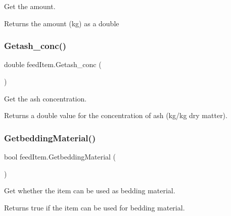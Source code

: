 Get the amount. 

\begin{DoxyReturn}{Returns}
the amount (kg) as a double 
\end{DoxyReturn}
\mbox{\label{classfeed_item_a2250428bfac6980e46db357f192d979e}} 
\subsubsection{\texorpdfstring{Getash\_conc()}{Getash\_conc()}}
{\footnotesize\ttfamily double feed\+Item.\+Getash\+\_\+conc (\begin{DoxyParamCaption}{ }\end{DoxyParamCaption})\hspace{0.3cm}{\ttfamily [inline]}}



Get the ash concentration. 

\begin{DoxyReturn}{Returns}
a double value for the concentration of ash (kg/kg dry matter). 
\end{DoxyReturn}
\mbox{\label{classfeed_item_a0c317f7da87544acbc40bde36f78dd76}} 
\subsubsection{\texorpdfstring{GetbeddingMaterial()}{GetbeddingMaterial()}}
{\footnotesize\ttfamily bool feed\+Item.\+Getbedding\+Material (\begin{DoxyParamCaption}{ }\end{DoxyParamCaption})\hspace{0.3cm}{\ttfamily [inline]}}



Get whether the item can be used as bedding material. 

\begin{DoxyReturn}{Returns}
true if the item can be used for bedding material. 
\end{DoxyReturn}
\mbox{\label{classfeed_item_afb82b1257ec3d3e9cb1dedae71273557}} 
